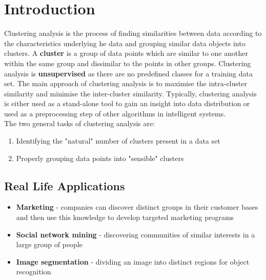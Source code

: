 \documentclass[11pt,fleqn]{book} %
\begin{document}
\section*{Introduction}
Clustering analysis is the process of finding similarities between data according to the characteristics underlying he data and grouping similar data objects into clusters. A \textbf{cluster} is a group of data points which are similar to one another within the same group and dissimilar to the points in other groups. Clustering analysis is \textbf{unsupervised} as there are no predefined classes for a training data set. The main approach of clustering analysis is to maximise the intra-cluster similarity and minimise the inter-cluster similarity. Typically, clustering analysis is either used as a stand-alone tool to gain an insight into data distribution or used as a preprocessing step of other algorithms in intelligent systems.\\

\noindent
The two general tasks of clustering analysis are:
\begin{enumerate}
	\item Identifying the "natural" number of clusters present in a data set
	\item Properly grouping data points into "sensible" clusters
\end{enumerate}

\subsection*{Real Life Applications}
\begin{itemize}
	\item \textbf{Marketing} - companies can discover distinct groups in their customer bases and then use this knowledge to develop targeted marketing programs
	\item \textbf{Social network mining} - discovering communities of similar interests in a large group of people
	\item \textbf{Image segmentation} - dividing an image into distinct regions for object recognition
\end{itemize}
\end{document}
